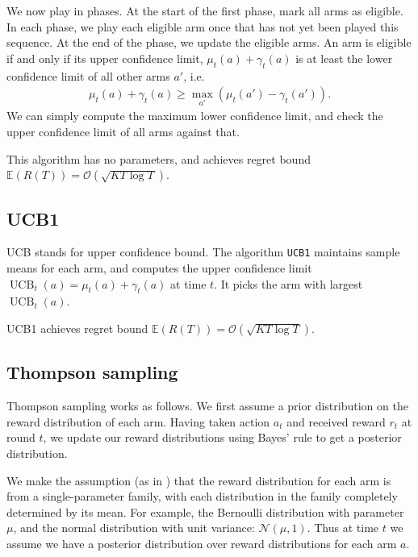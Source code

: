 \documentclass[10pt]{article}
\newcommand{\EE}{\mathbb{E}}
\newcommand{\bigoh}{\mathcal{O}}
\DeclareMathOperator{\UCB}{UCB}
\begin{document}
We now play in phases. At the start of the first phase, mark all arms as
eligible. In each phase, we play each eligible arm once that has not yet been
played this sequence. At the end of the phase, we update the eligible arms. An
arm is eligible if and only if its upper confidence limit, $\mu_t(a) +
\gamma_t(a)$ is at least the lower confidence limit of all other arms $a'$, i.e.
\begin{align*}
    \mu_t(a) + \gamma_t(a) \ge \max_{a'} (\mu_t(a') - \gamma_t(a')).
\end{align*}
We can simply compute the maximum lower confidence limit, and check the upper
confidence limit of all arms against that.

This algorithm has no parameters, and achieves regret bound $\EE(R(T)) =
\bigoh(\sqrt{K T \log T})$.

\subsection{UCB1}
UCB stands for upper confidence bound. The algorithm \verb'UCB1' maintains
sample means for each arm, and computes the upper confidence limit $\UCB_t(a) =
\mu_t(a) + \gamma_t(a)$ at time $t$. It picks the arm with largest $\UCB_t(a)$.

UCB1 achieves regret bound $\EE(R(T)) = \bigoh(\sqrt{K T \log T})$.

\subsection{Thompson sampling}
Thompson sampling works as follows. We first assume a prior distribution on the
reward distribution of each arm. Having taken action $a_t$ and received reward
$r_t$ at round $t$, we update our reward distributions using Bayes' rule to get
a posterior distribution.

We make the assumption (as in \cite{Slivkins}) that the reward distribution for
each arm is from a single-parameter family, with each distribution in the family
completely determined by its mean. For example, the Bernoulli distribution with
parameter $\mu$, and the normal distribution with unit variance:
$\mathcal{N}(\mu, 1)$. Thus at time $t$ we assume we have a posterior
distribution over reward distributions for each arm $a$.
\end{document}
